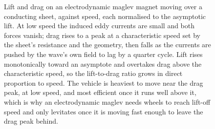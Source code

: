 \begin{figure}[htbp]
\centering
{}
\caption[Eddy-current maglev lift and drag]{Lift and drag on an
electrodynamic maglev magnet moving over a conducting sheet, against speed,
each normalised to the asymptotic lift. At low speed the induced eddy currents
are small and both forces vanish; drag rises to a peak at a characteristic
speed set by the sheet's resistance and the geometry, then falls as the
currents are pushed by the wave's own field to lag by a quarter cycle. Lift
rises monotonically toward an asymptote and overtakes drag above the
characteristic speed, so the lift-to-drag ratio grows in direct proportion to
speed. The vehicle is heaviest to move near the drag peak, at low speed, and
most efficient once it runs well above it, which is why an electrodynamic
maglev needs wheels to reach lift-off speed and only levitates once it is
moving fast enough to leave the drag peak behind.}
\label{fig:vol04ch08:eddy-maglev}
\end{figure}
